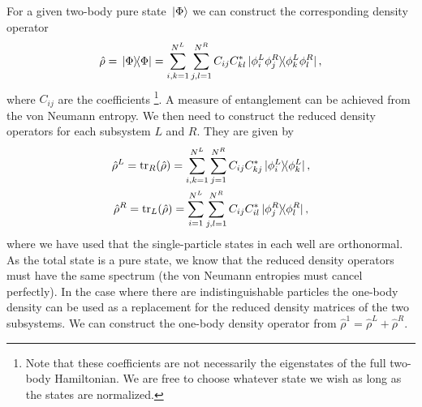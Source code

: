\documentclass[twocolumn,superscriptaddress,unsortedaddress,
 amsmath,amssymb,
 aps,
]{revtex4-2}
\begin{document}
        For a given two-body pure state $\ket*{\Phi}$ we can construct the
        corresponding density operator
        \begin{align*}
            \hat{\rho} = \dyad*{\Phi}{\Phi}
            = \sum_{i, k = 1}^{N^L}
            \sum_{j, l = 1}^{N^R}
            C_{ij} C^{*}_{kl} \dyad*{\phi^L_i \phi^R_j}{
                \phi^L_k \phi^R_l
            },
        \end{align*}
        where $C_{ij}$ are the coefficients \footnote{
            Note that these coefficients are not necessarily the eigenstates
            of the full two-body Hamiltonian.
            We are free to choose whatever state we wish as long as the states
            are normalized.
        }.
        A measure of entanglement can be achieved from the von Neumann entropy.
        We then need to construct the reduced density operators for each
        subsystem $L$ and $R$.
        They are given by
        \begin{gather*}
            \hat{\rho}^L
            = \tr_R \! \qty(\hat{\rho})
            = \sum_{i, k = 1}^{N^L} \sum_{j = 1}^{N^R}
            C_{ij} C^{*}_{kj} \dyad*{\phi^L_i}{\phi^L_k},
            \\
            \hat{\rho}^R
            = \tr_{L} \! \qty(\hat{\rho})
            = \sum_{i = 1}^{N^L} \sum_{j, l = 1}^{N^R}
            C_{ij} C^{*}_{il} \dyad*{\phi^R_j}{\phi^R_l},
        \end{gather*}
        where we have used that the single-particle states in each well are
        orthonormal.
        As the total state is a pure state, we know that the reduced density
        operators must have the same spectrum (the von Neumann entropies must
        cancel perfectly).
        In the case where there are indistinguishable particles the one-body
        density can be used as a replacement for the reduced density matrices
        of the two subsystems.
        We can construct the one-body density operator from $\hat{\rho}^1
        = \hat{\rho}^L + \hat{\rho}^R$.


        
\end{document}
